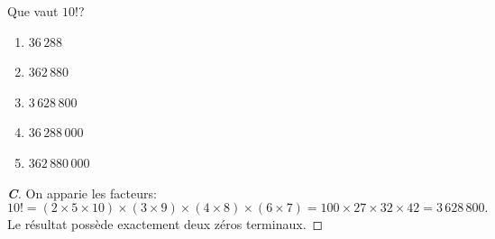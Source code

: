 % 
%
Que vaut $10!$?
\begin{enumerate}
  \item $36\,288$
  \item $362\,880$
  \item $3\,628\,800$
  \item $36\,288\,000$
  \item $362\,880\,000$
\end{enumerate}
%
%
\begin{proof}[\textbf{C}]
On apparie les facteurs:
\begin{equation}
  10! = (2 \times 5 \times 10) \times (3 \times 9) \times (4 \times 8) \times (6 \times 7)
      = 100 \times 27 \times 32 \times 42 = 3\,628\,800.
\end{equation}
Le résultat possède exactement deux zéros terminaux.
\end{proof}
